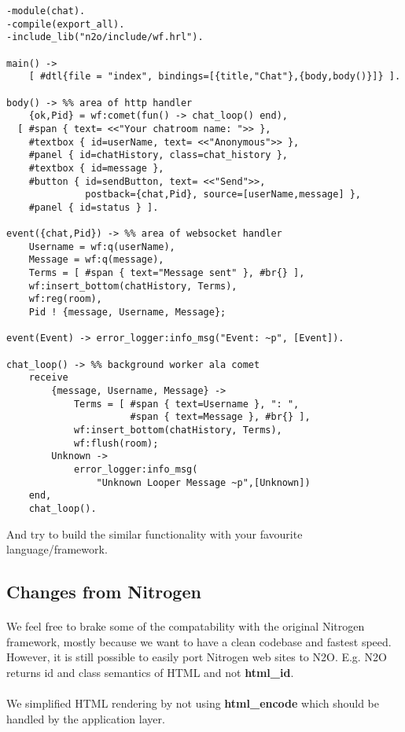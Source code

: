 \newpage
\begin{lstlisting}[caption=chat.erl]
-module(chat).
-compile(export_all).
-include_lib("n2o/include/wf.hrl").

main() -> 
    [ #dtl{file = "index", bindings=[{title,"Chat"},{body,body()}]} ].

body() -> %% area of http handler
    {ok,Pid} = wf:comet(fun() -> chat_loop() end),
  [ #span { text= <<"Your chatroom name: ">> }, 
    #textbox { id=userName, text= <<"Anonymous">> },
    #panel { id=chatHistory, class=chat_history },
    #textbox { id=message },
    #button { id=sendButton, text= <<"Send">>, 
              postback={chat,Pid}, source=[userName,message] },
    #panel { id=status } ].

event({chat,Pid}) -> %% area of websocket handler
    Username = wf:q(userName),
    Message = wf:q(message),
    Terms = [ #span { text="Message sent" }, #br{} ],
    wf:insert_bottom(chatHistory, Terms),
    wf:reg(room),
    Pid ! {message, Username, Message};

event(Event) -> error_logger:info_msg("Event: ~p", [Event]).

chat_loop() -> %% background worker ala comet
    receive 
        {message, Username, Message} ->
            Terms = [ #span { text=Username }, ": ",
                      #span { text=Message }, #br{} ],
            wf:insert_bottom(chatHistory, Terms),
            wf:flush(room);
        Unknown -> 
            error_logger:info_msg(
                "Unknown Looper Message ~p",[Unknown])
    end,
    chat_loop().
\end{lstlisting}

And try to build the similar functionality with your favourite language/framework.

\subsection*{Changes from Nitrogen}
\paragraph{}
We feel free to brake some of the compatability with the original
Nitrogen framework, mostly because we want to have a clean codebase
and fastest speed. However, it is still possible to easily port
Nitrogen web sites to N2O. E.g. N2O returns id and class semantics
of HTML and not {\bf html\_id}.

\paragraph{}
We simplified HTML rendering by not using
{\bf html\_encode} which should be handled by the application layer.

